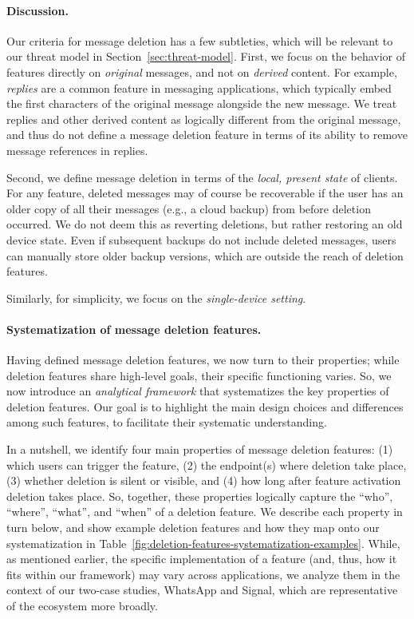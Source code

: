\paragraph{Discussion.} Our criteria for message deletion has a few subtleties, which will be relevant to our threat model in Section~\ref{sec:threat-model}. First, we focus on the behavior of features directly on \emph{original} messages, and not on \emph{derived} content. For example, \emph{replies} are a common feature in messaging applications, which typically embed the first characters of the original message alongside the new message. We treat replies and other derived content as logically different from the original message, and thus do not define a message deletion feature in terms of its ability to remove message references in replies.

Second, we define message deletion in terms of the \emph{local, present state} of clients. For any feature, deleted messages may of course be recoverable if the user has an older copy of all their messages (e.g., a cloud backup) from before deletion occurred. We do not deem this as reverting deletions, but rather restoring an old device state. Even if subsequent backups do not include deleted messages, users can manually store older backup versions, which are outside the reach of deletion features.


Similarly, for simplicity, we focus on the \emph{single-device setting}.





\paragraph{Systematization of message deletion features.} Having defined message deletion features, we now turn to their properties; while deletion features share high-level goals, their specific functioning varies. So, we now introduce an \emph{analytical framework} that systematizes the key properties of deletion features. Our goal is to highlight the main design choices and differences among such features, to facilitate their systematic understanding.


In a nutshell, we identify four main properties of message deletion features: (1) which users can trigger the feature, (2) the endpoint(s) where deletion take place, (3) whether deletion is silent or visible, and (4) how long after feature activation deletion takes place. So, together, these properties logically capture the ``who'', ``where'', ``what'', and ``when'' of a deletion feature. We describe each property in turn below, and show example deletion features and how they map onto our systematization in Table~\ref{fig:deletion-features-systematization-examples}. While, as mentioned earlier, the specific implementation of a feature (and, thus, how it fits within our framework) may vary across applications, we analyze them in the context of our two-case studies, WhatsApp and Signal, which are representative of the ecosystem more broadly.


